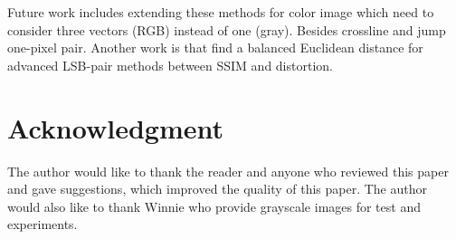 \documentclass[%
    reprint,
    amsmath,amssymb,
    aps,
   ]{revtex4-1}
\begin{document}
   Future work includes extending these methods for color image which need to consider three vectors (RGB) instead of one (gray). Besides crossline and jump one-pixel pair. Another work is that find a balanced Euclidean distance for advanced LSB-pair methods between SSIM and distortion.  
   
   
   
   \section{\label{sec:level1}Acknowledgment}
   
   The author would like to thank the reader and anyone who reviewed this paper and gave suggestions, which improved the quality of this paper. The author would also like to thank Winnie who provide grayscale images for test and experiments. 
   
   
   
   
   
   
   
\end{document}
